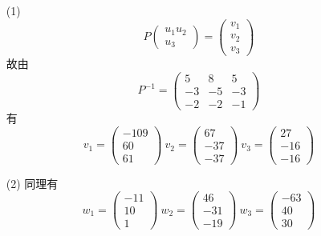 \documentclass{article}
\begin{document}
\begin{itemize}
    \item [(1)]
    \[
        P
        \begin{pmatrix}
            u_1  u_2 \\ u_3
        \end{pmatrix} = 
        \begin{pmatrix}
            v_1 \\ v_2 \\ v_3
        \end{pmatrix}
    \]
    故由 
    \[
        P^{-1} = \begin{pmatrix}
            5 & 8 & 5 \\
            -3 & -5 & -3 \\
            -2 & -2 & -1
        \end{pmatrix}
    \]
    有
    \[
        v_1 = \begin{pmatrix}
            -109 \\ 60 \\ 61
        \end{pmatrix}\ 
        v_2 = \begin{pmatrix}
            67 \\ -37 \\ -37
        \end{pmatrix}\   
        v_3 = \begin{pmatrix}
            27 \\ -16 \\ -16
        \end{pmatrix}
    \]
    \item [(2)]
    同理有 
    \[
        w_1 = \begin{pmatrix}
            -11 \\ 10 \\ 1
        \end{pmatrix}\ 
        w_2 = \begin{pmatrix}
            46 \\ -31 \\ -19
        \end{pmatrix}\   
        w_3 = \begin{pmatrix}
            -63 \\ 40 \\ 30
        \end{pmatrix}
    \]
\end{itemize}

\section{}
\end{document}
